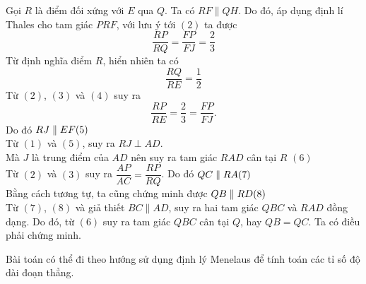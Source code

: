 \begin{bt}
{	Gọi $R$ là điểm đối xứng với $E$ qua $Q$. Ta có $RF\parallel QH$. Do đó, áp dụng định lí Thales cho tam giác $PRF$, với lưu ý tới $(2)$ ta được
	\[\dfrac{RP}{RQ}=\dfrac{FP}{FJ}=\dfrac{2}{3}\tag{3}\]
	Từ định nghĩa điểm $R$, hiển nhiên ta có
	\[\dfrac{RQ}{RE}=\dfrac{1}{2}\tag{4}\]
	Từ $(2)$, $(3)$ và $(4)$ suy ra
	\[\dfrac{RP}{RE}=\dfrac{2}{3}=\dfrac{FP}{FJ}.\]
	Do đó $RJ\parallel EF\hfill (5)$\\
	Từ $(1)$ và $(5)$, suy ra $RJ\perp AD$.\\
	Mà $J$ là trung điểm của $AD$ nên suy ra tam giác $RAD$ cân tại $R$ \hfill $(6)$\\
	Từ $(2)$ và $(3)$ suy ra $\dfrac{AP}{AC}=\dfrac{RP}{RQ}$. Do đó $QC\parallel RA\hfill (7)$\\
	Bằng cách tương tự, ta cũng chứng minh được $QB\parallel RD \hfill (8)$\\
	Từ $(7)$, $(8)$ và giả thiết $BC\parallel AD$, suy ra hai tam giác $QBC$ và $RAD$ đồng dạng. Do đó, từ $(6)$ suy ra tam giác $QBC$ cân tại $Q$, hay $QB=QC$. Ta có điều phải chứng minh.
		\begin{nx}
			Bài toán có thể đi theo hướng sử dụng định lý Menelaus để tính toán các tỉ số độ dài đoạn thẳng.
		\end{nx}
}
\end{bt}

